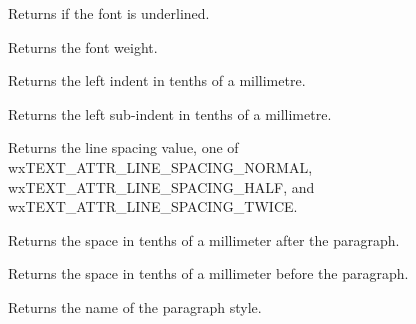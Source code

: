 \label{wxrichtextattrgetfontunderlined}


Returns \true if the font is underlined.

\label{wxrichtextattrgetfontweight}


Returns the font weight.

\label{wxrichtextattrgetleftindent}


Returns the left indent in tenths of a millimetre.

\label{wxrichtextattrgetleftsubindent}


Returns the left sub-indent in tenths of a millimetre.

\label{wxrichtextattrgetlinespacing}


Returns the line spacing value, one of wxTEXT\_ATTR\_LINE\_SPACING\_NORMAL,
wxTEXT\_ATTR\_LINE\_SPACING\_HALF, and wxTEXT\_ATTR\_LINE\_SPACING\_TWICE.

\label{wxrichtextattrgetparagraphspacingafter}


Returns the space in tenths of a millimeter after the paragraph.

\label{wxrichtextattrgetparagraphspacingbefore}


Returns the space in tenths of a millimeter before the paragraph.

\label{wxrichtextattrgetparagraphstylename}


Returns the name of the paragraph style.

\label{wxrichtextattrgetrightindent}

